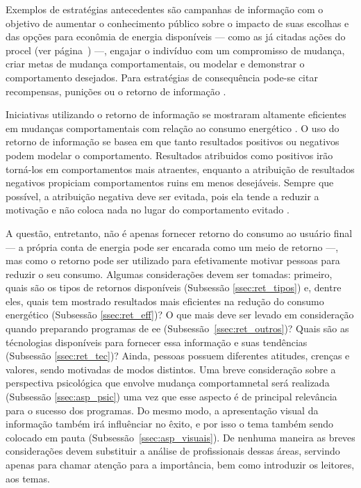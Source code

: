 Exemplos de estratégias antecedentes são campanhas de informação 
com o objetivo de aumentar o conhecimento público sobre o impacto de suas 
escolhas e das opções para econômia de energia disponíveis --- como 
as já citadas ações do \gls{procel} (ver página~\pageref{text:prog_cepel}) ---,
engajar o indivíduo com um compromisso de mudança, criar metas de mudança
comportamentais, ou modelar e demonstrar o comportamento desejados. Para
estratégias de consequência pode-se citar recompensas, punições ou o
retorno de informação \cite{aceee_2010_estudos_feedback,2009_epri}. 

Iniciativas utilizando o retorno de informação se mostraram altamente eficientes
em mudanças comportamentais com relação ao consumo energético \cite{
aceee_2010_estudos_feedback,2009_epri,2012_schleich__austria,
2011_zhifeng_smart_energy_savings,2006_darby,2009_nber_studies_us,
ucla_studies_1975_2011_usa}. O uso do retorno
de informação se basea em que tanto resultados positivos ou
negativos podem modelar o comportamento. Resultados atribuidos como positivos 
irão torná-los em comportamentos mais atraentes, enquanto a atribuição de
resultados negativos propiciam comportamentos ruins em menos desejáveis. 
Sempre que possível, a atribuição negativa 
deve ser evitada, pois ela tende a reduzir a motivação e não coloca nada no 
lugar do comportamento evitado \cite{2010_aspectos_psicologicos_usa}.

A questão, entretanto, não é apenas fornecer retorno do consumo ao usuário final 
--- a própria conta de energia pode ser encarada como um meio de retorno ---, 
mas como o retorno pode ser utilizado para efetivamente motivar pessoas 
para reduzir o seu consumo. Algumas considerações devem ser tomadas: primeiro, 
quais são os tipos de retornos disponíveis (Subsessão \ref{ssec:ret_tipos}) e, 
dentre eles, quais tem mostrado resultados mais eficientes na redução do consumo
energético (Subsessão \ref{ssec:ret_eff})? O que mais deve ser levado em
consideração quando preparando programas de \gls{ee}
(Subsessão~\ref{ssec:ret_outros})? Quais são as técnologias 
disponíveis para fornecer essa informação e 
suas tendências (Subsessão \ref{ssec:ret_tec})? 
Ainda, pessoas possuem diferentes atitudes, crenças e valores, sendo motivadas 
de modos distintos. Uma breve consideração sobre a perspectiva psicológica que
envolve mudança comportamnetal será realizada (Subsessão \ref{ssec:asp_psic})
uma vez que esse aspecto é de principal relevância para o sucesso dos programas. 
Do mesmo modo, a apresentação visual da informação também irá influênciar no 
êxito, e por isso o tema também sendo colocado em pauta
(Subsessão~\ref{ssec:asp_visuais}). De nenhuma maneira as breves considerações 
devem substituir a análise de profissionais dessas áreas, servindo apenas para 
chamar atenção para a importância, bem como introduzir os leitores, aos temas. 

